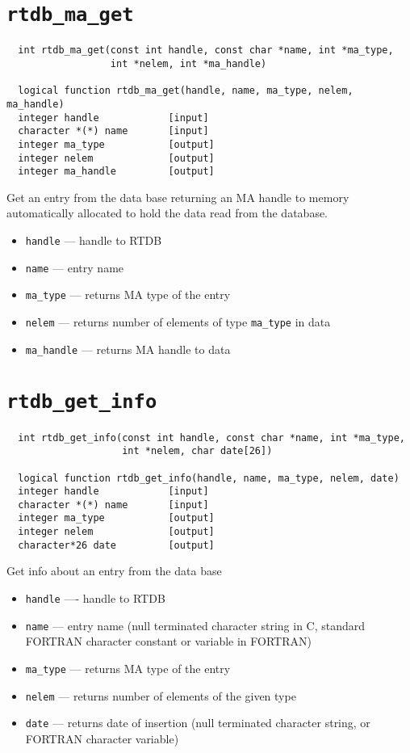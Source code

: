 \section{{\tt rtdb\_ma\_get}}
\begin{verbatim}
  int rtdb_ma_get(const int handle, const char *name, int *ma_type,
                  int *nelem, int *ma_handle)

  logical function rtdb_ma_get(handle, name, ma_type, nelem, ma_handle)
  integer handle            [input]
  character *(*) name       [input]
  integer ma_type           [output]
  integer nelem             [output]
  integer ma_handle         [output]
\end{verbatim}
Get an entry from the data base returning an MA handle to memory
automatically allocated to hold the data read from the database.
\begin{itemize}  
\item {\tt handle} --- handle to RTDB
\item {\tt name} --- entry name
\item {\tt ma\_type} --- returns MA type of the entry
\item {\tt nelem} --- returns number of elements of type {\tt ma\_type} in data
\item {\tt ma\_handle} --- returns MA handle to data
\end{itemize}


\section{{\tt rtdb\_get\_info}}
\begin{verbatim}
  int rtdb_get_info(const int handle, const char *name, int *ma_type, 
                    int *nelem, char date[26])

  logical function rtdb_get_info(handle, name, ma_type, nelem, date)
  integer handle            [input]
  character *(*) name       [input]
  integer ma_type           [output]
  integer nelem             [output]
  character*26 date         [output]
\end{verbatim}
Get info about an entry from the data base
\begin{itemize}
\item {\tt handle} ---- handle to RTDB
\item {\tt name} --- entry name (null terminated character string in
  C,  standard FORTRAN character constant or variable in FORTRAN)
\item {\tt ma\_type} --- returns MA type of the entry
\item {\tt nelem} --- returns number of elements of the given type
\item {\tt date} --- returns date of insertion (null terminated
  character string, or FORTRAN character variable)
\end{itemize}

